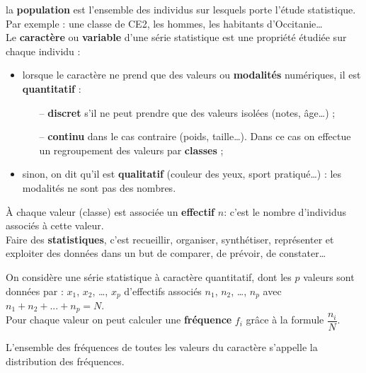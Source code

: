 \begin{vocabulaire}
   la \textbf{population} est l'ensemble des individus sur lesquels porte l'étude statistique. Par exemple : une classe de CE2, les hommes, les habitants d'Occitanie\dots \\
   Le \textbf{caractère} ou \textbf{variable} d'une série statistique est une propriété étudiée sur chaque individu :
   \begin{itemize}
      \item lorsque le caractère ne prend que des valeurs ou \textbf{modalités} numériques, il est \textbf{quantitatif} :
         \begin{itemize}
             \item[--] \textbf{discret} s'il ne peut prendre que des valeurs isolées (notes, âge\dots) ;
             \item[--] \textbf{continu} dans le cas contraire (poids, taille\dots ). Dans ce cas on effectue un regroupement des valeurs par \textbf{classes} ;
          \end{itemize}
     \item sinon, on dit qu'il est \textbf{qualitatif} (couleur des yeux, sport pratiqué\dots ) : les modalités ne sont pas des nombres.
   \end{itemize}
   À chaque valeur (classe) est associée un \textbf{effectif} $n$: c'est le nombre  d'individus associés à cette valeur. \\
   Faire des \textbf{statistiques}, c'est recueillir, organiser, synthétiser, représenter et exploiter des données dans un but de comparer, de prévoir, de constater\dots
\end{vocabulaire}

\begin{definition}[Fréquence]
   On considère une série statistique à caractère quantitatif, dont les $p$ valeurs sont données par : $x_1$, $x_2$, \dots, $x_p$ d'effectifs associés $n_1$, $n_2$, \dots, $n_p$ avec $n_1+n_2+...+n_p=N$. \\
   Pour chaque valeur on peut calculer une \textbf{fréquence} $f_i$ grâce à la formule $\dfrac{n_i}{N}$.
\end{definition}

\medskip

L'ensemble des fréquences de toutes les valeurs du caractère s'appelle la distribution des fréquences.
 
